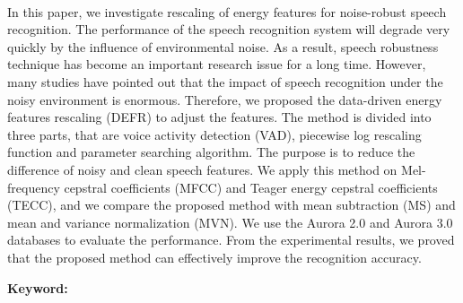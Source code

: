 \renewcommand{\thesisabstracthead}{ABSTRACT}
\renewcommand{\thesistitle}{\thesistitleenglish}
\begin{thesisabstract}
\\
In this paper, we investigate rescaling of energy features for noise-robust speech recognition.
The performance of the speech recognition system will degrade very quickly by the influence of environmental noise.
As a result, speech robustness technique has become an important research issue for a long time.
However, many studies have pointed out that the impact of speech recognition under the noisy environment is enormous.
Therefore, we proposed the data-driven energy features rescaling (DEFR) to adjust the features.
The method is divided into three parts, that are voice activity detection (VAD), piecewise log rescaling function and
parameter searching algorithm.
The purpose is to reduce the difference of noisy and clean speech features.
We apply this method on Mel-frequency cepstral coefficients (MFCC) and Teager energy cepstral coefficients (TECC), and we compare the proposed method with mean subtraction (MS) and mean and variance normalization (MVN).
We use the Aurora 2.0 and Aurora 3.0 databases to evaluate the performance.
From the experimental results, we proved that the proposed method can effectively improve the recognition accuracy.

  \vspace{\baselineskip}
  \noindent
  \textbf{Keyword:} \engKeywords


\end{thesisabstract}

